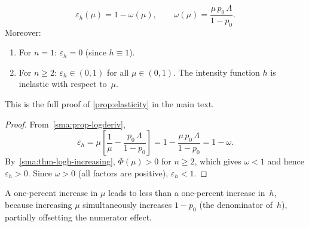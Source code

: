 \begin{proposition}
  \label{sma:prop-elasticity-bounds}
  \begin{equation}\label{sma:eq-elasticity-formula}
    \boxed{
      \varepsilon_h(\mu)
      = 1 - \omega(\mu),
      \qquad
      \omega(\mu) = \frac{\mu\, p_0\, \Lambda}{1-p_0}.
    }
  \end{equation}
  Moreover:
  \begin{enumerate}[label=\textup{(\roman*)}]
    \item For $n = 1$: $\varepsilon_h = 0$ (since $h \equiv 1$).
    \item For $n \ge 2$:
      $\varepsilon_h \in (0,1)$ for all $\mu \in (0,1)$.
      The intensity function $h$ is inelastic with respect to~$\mu$.
  \end{enumerate}
  This is the full proof of\/ \cref{prop:elasticity} in the main text.
\end{proposition}

\begin{proof}
  From~\cref{sma:prop-logderiv},
  \[
    \varepsilon_h
    = \mu\left[\frac{1}{\mu} - \frac{p_0\,\Lambda}{1-p_0}\right]
    = 1 - \frac{\mu\, p_0\,\Lambda}{1-p_0}
    = 1 - \omega.
  \]
  By~\cref{sma:thm-logh-increasing}, $\Phi(\mu) > 0$ for $n \ge 2$,
  which gives $\omega < 1$ and hence $\varepsilon_h > 0$.
  Since $\omega > 0$ (all factors are positive), $\varepsilon_h < 1$.
\end{proof}

\begin{remark}\label{sma:rem-inelastic}
  A one-percent increase in $\mu$ leads to less than a one-percent
  increase in~$h$, because increasing $\mu$ simultaneously increases
  $1 - p_0$ (the denominator of~$h$), partially offsetting the numerator
  effect.
\end{remark}

